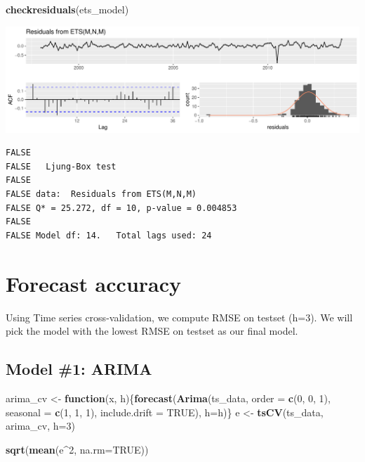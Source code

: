 \documentclass[openany]{book}
\newenvironment{Shaded}{\begin{snugshade}}{\end{snugshade}}
\newcommand{\ControlFlowTok}[1]{\textcolor[rgb]{0.13,0.29,0.53}{\textbf{#1}}}
\newcommand{\DataTypeTok}[1]{\textcolor[rgb]{0.13,0.29,0.53}{#1}}
\newcommand{\DecValTok}[1]{\textcolor[rgb]{0.00,0.00,0.81}{#1}}
\newcommand{\KeywordTok}[1]{\textcolor[rgb]{0.13,0.29,0.53}{\textbf{#1}}}
\newcommand{\NormalTok}[1]{#1}
\newcommand{\OperatorTok}[1]{\textcolor[rgb]{0.81,0.36,0.00}{\textbf{#1}}}
\newcommand{\OtherTok}[1]{\textcolor[rgb]{0.56,0.35,0.01}{#1}}
\newcommand{\StringTok}[1]{\textcolor[rgb]{0.31,0.60,0.02}{#1}}
\begin{document}
\begin{Shaded}
\begin{Highlighting}[]
\KeywordTok{checkresiduals}\NormalTok{(ets_model)}
\end{Highlighting}
\end{Shaded}

\includegraphics{Part-B-AS_files/figure-latex/unnamed-chunk-7-2.pdf}

\begin{verbatim}
FALSE 
FALSE   Ljung-Box test
FALSE 
FALSE data:  Residuals from ETS(M,N,M)
FALSE Q* = 25.272, df = 10, p-value = 0.004853
FALSE 
FALSE Model df: 14.   Total lags used: 24
\end{verbatim}

\hypertarget{forecast-accuracy}{%
\section{Forecast accuracy}\label{forecast-accuracy}}

Using Time series cross-validation, we compute RMSE on testset (h=3). We
will pick the model with the lowest RMSE on testset as our final model.

\hypertarget{model-1-arima-1}{%
\subsection{Model \#1: ARIMA}\label{model-1-arima-1}}

\begin{Shaded}
\begin{Highlighting}[]
\NormalTok{arima_cv <-}\StringTok{ }\ControlFlowTok{function}\NormalTok{(x, h)\{}\KeywordTok{forecast}\NormalTok{(}\KeywordTok{Arima}\NormalTok{(ts_data, }\DataTypeTok{order =} \KeywordTok{c}\NormalTok{(}\DecValTok{0}\NormalTok{, }\DecValTok{0}\NormalTok{, }\DecValTok{1}\NormalTok{), }\DataTypeTok{seasonal =} \KeywordTok{c}\NormalTok{(}\DecValTok{1}\NormalTok{, }\DecValTok{1}\NormalTok{, }\DecValTok{1}\NormalTok{),  }\DataTypeTok{include.drift =} \OtherTok{TRUE}\NormalTok{), }\DataTypeTok{h=}\NormalTok{h)\}}
\NormalTok{e <-}\StringTok{ }\KeywordTok{tsCV}\NormalTok{(ts_data, arima_cv, }\DataTypeTok{h=}\DecValTok{3}\NormalTok{)}

\KeywordTok{sqrt}\NormalTok{(}\KeywordTok{mean}\NormalTok{(e}\OperatorTok{^}\DecValTok{2}\NormalTok{, }\DataTypeTok{na.rm=}\OtherTok{TRUE}\NormalTok{))}
\end{Highlighting}
\end{Shaded}
\end{document}

